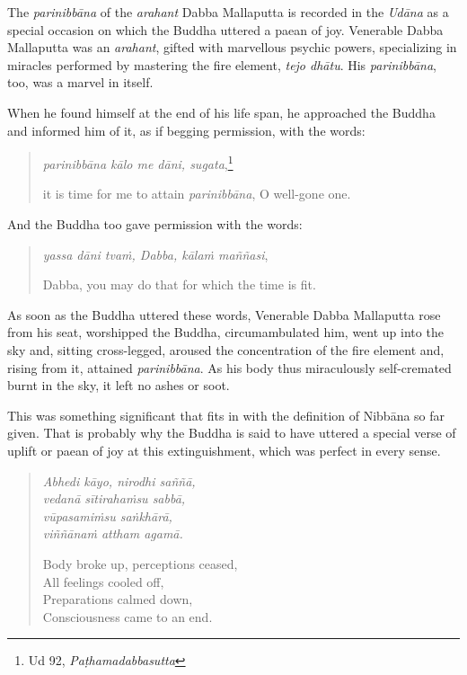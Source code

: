 The \emph{parinibbāna} of the \emph{arahant} Dabba Mallaputta is recorded in the \emph{Udāna} as a special occasion on which the Buddha uttered a paean of joy. Venerable Dabba Mallaputta was an \emph{arahant}, gifted with marvellous psychic powers, specializing in miracles performed by mastering the fire element, \emph{tejo dhātu}. His \emph{parinibbāna}, too, was a marvel in itself.

When he found himself at the end of his life span, he approached the Buddha and informed him of it, as if begging permission, with the words:

\begin{quote}
\emph{parinibbāna kālo me dāni, sugata},\footnote{Ud 92, \emph{Paṭhamadabbasutta}}

it is time for me to attain \emph{parinibbāna}, O well-gone one.
\end{quote}

And the Buddha too gave permission with the words:

\begin{quote}
\emph{yassa dāni tvaṁ, Dabba, kālaṁ maññasi},

Dabba, you may do that for which the time is fit.
\end{quote}

As soon as the Buddha uttered these words, Venerable Dabba Mallaputta rose from his seat, worshipped the Buddha, circumambulated him, went up into the sky and, sitting cross-legged, aroused the concentration of the fire element and, rising from it, attained \emph{parinibbāna}. As his body thus miraculously self-cremated burnt in the sky, it left no ashes or soot.

This was something significant that fits in with the definition of Nibbāna so far given. That is probably why the Buddha is said to have uttered a special verse of uplift or paean of joy at this extinguishment, which was perfect in every sense.

\begin{quote}
\emph{Abhedi kāyo, nirodhi saññā,}\\
\emph{vedanā sītirahaṁsu sabbā,}\\
\emph{vūpasamiṁsu saṅkhārā,}\\
\emph{viññānaṁ attham agamā.}

Body broke up, perceptions ceased,\\
All feelings cooled off,\\
Preparations calmed down,\\
Consciousness came to an end.
\end{quote}

